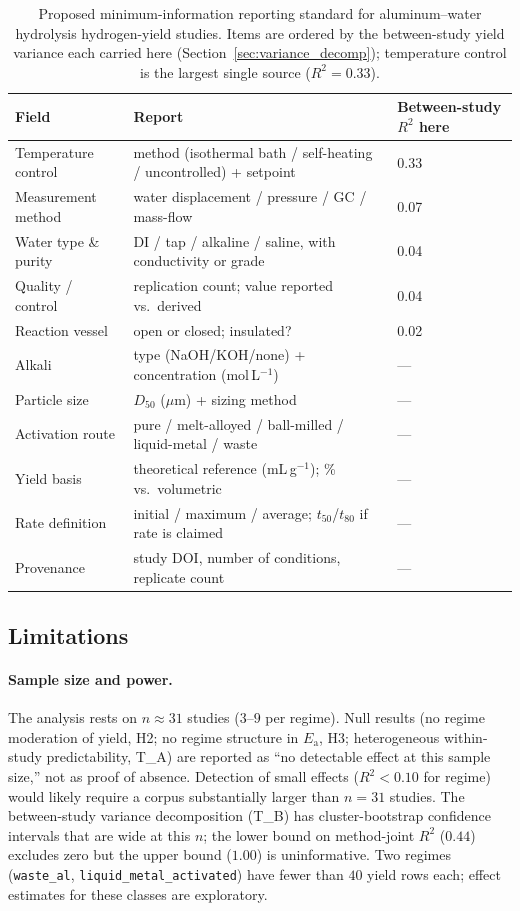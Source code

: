 \begin{table}[t]\centering\small
\caption{Proposed minimum-information reporting standard for aluminum--water hydrolysis
hydrogen-yield studies. Items are ordered by the between-study yield variance each
carried here (Section~\ref{sec:variance_decomp}); temperature control is the largest
single source ($R^2\!=\!0.33$).}
\label{tab:mireport}
\begin{tabular}{lll}
\toprule
Field & Report & Between-study $R^2$ here \\
\midrule
Temperature control  & method (isothermal bath / self-heating / uncontrolled) + setpoint & 0.33 \\
Measurement method   & water displacement / pressure / GC / mass-flow & 0.07 \\
Water type \& purity & DI / tap / alkaline / saline, with conductivity or grade & 0.04 \\
Quality / control    & replication count; value reported vs.\ derived & 0.04 \\
Reaction vessel      & open or closed; insulated? & 0.02 \\
Alkali               & type (NaOH/KOH/none) + concentration (mol\,L$^{-1}$) & --- \\
Particle size        & $D_{50}$ ($\mu$m) + sizing method & --- \\
Activation route     & pure / melt-alloyed / ball-milled / liquid-metal / waste & --- \\
Yield basis          & theoretical reference (mL\,g$^{-1}$); \% vs.\ volumetric & --- \\
Rate definition      & initial / maximum / average; $t_{50}$/$t_{80}$ if rate is claimed & --- \\
Provenance           & study DOI, number of conditions, replicate count & --- \\
\bottomrule
\end{tabular}
\end{table}

\subsection{Limitations}
\label{sec:limitations}

\paragraph{Sample size and power.}
The analysis rests on $n\!\approx\!31$ studies ($3$--$9$ per regime). Null results
(no regime moderation of yield, H2; no regime structure in $E_\mathrm{a}$, H3;
heterogeneous within-study predictability, T\_A) are reported as ``no detectable effect
at this sample size,'' not as proof of absence. Detection of small effects ($R^2\!<\!0.10$ for regime) would
likely require a corpus substantially larger than $n\!=\!31$ studies.
The between-study variance decomposition
(T\_B) has cluster-bootstrap confidence intervals that are wide at this $n$; the lower
bound on method-joint $R^2$ ($0.44$) excludes zero but the upper bound ($1.00$) is
uninformative. Two regimes (\texttt{waste\_al}, \texttt{liquid\_metal\_activated}) have
fewer than $40$ yield rows each; effect estimates for these classes are exploratory.

